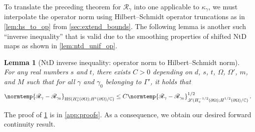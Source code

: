 \documentclass[pdflatex,sn-mathphys-num]{sn-jnl-preprint}
\newcommand{\C}{\mathbb{C}}
\newcommand{\sL}{\mathscr{L}}
\newcommand{\sR}{\mathscr{R}}
\newcommand{\pOmega}{{\partial\Omega}}
\newcommand{\ntd}{\mathscr{R}_{\gamma}}
\newcommand{\norm}{\normtemp}
\newcommand{\HS}{\mathrm{HS}} %
\theoremstyle{thmstyleone}%
\newtheorem{lemma}[theorem]{Lemma}%
\theoremstyle{thmstyletwo}%
\theoremstyle{thmstylethree}%
\numberwithin{equation}{section}
\numberwithin{theorem}{section}
\begin{document}
To translate the preceding theorem for $\ntd$ into one applicable to $\kappa_\gamma$, we must interpolate the operator norm using Hilbert--Schmidt operator truncations as in \cref{lem:hs_to_op} from \cref{sec:extend_bounds}.
The following lemma is another such ``inverse inequality'' that is valid due to the smoothing properties of shifted NtD maps as shown in \cref{lem:ntd_unif_op}.
\begin{lemma}[NtD inverse inequality: operator norm to Hilbert--Schmidt norm]\label{lem:op_to_hs}
    For any real numbers $s$ and $t$, there exists $C>0$ depending on $d$, $s$, $t$, $\Omega$, $\Omega'$, $m$, and $M$ such that for all $\gamma$ and $\gamma_0$ belonging to $\Gamma'$, it holds that
    \begin{align}\label{eqn:op_to_hs}
        \norm{\ntd-\sR_{\gamma_0}}_{\HS(H^s_\diamond(\pOmega);H^t(\pOmega)/\C)}
        \leq 
        C\norm{\ntd-\sR_{\gamma_0}}^{1/2}_{\sL(H^{-1/2}_\diamond(\pOmega);H_{\phantom{\diamond}}^{1/2}(\pOmega)/\C)}\,.
    \end{align}
\end{lemma}
The proof of \cref{lem:op_to_hs} is in \cref{app:proofs}. As a consequence, we obtain our desired forward continuity result.
\end{document}
